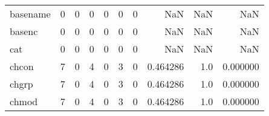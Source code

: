 \begin{tabular}{lrrrrrrrrr}
basename  &                                                  0 &                                                  0 &                                                  0 &                                                  0 &                                                  0 &                                                  0 &                                                NaN &                                    NaN &                                  NaN \\
basenc    &                                                  0 &                                                  0 &                                                  0 &                                                  0 &                                                  0 &                                                  0 &                                                NaN &                                    NaN &                                  NaN \\
cat       &                                                  0 &                                                  0 &                                                  0 &                                                  0 &                                                  0 &                                                  0 &                                                NaN &                                    NaN &                                  NaN \\
chcon     &                                                  7 &                                                  0 &                                                  4 &                                                  0 &                                                  3 &                                                  0 &                                           0.464286 &                                    1.0 &                             0.000000 \\
chgrp     &                                                  7 &                                                  0 &                                                  4 &                                                  0 &                                                  3 &                                                  0 &                                           0.464286 &                                    1.0 &                             0.000000 \\
chmod     &                                                  7 &                                                  0 &                                                  4 &                                                  0 &                                                  3 &                                                  0 &                                           0.464286 &                                    1.0 &                             0.000000 \\

\end{tabular}
